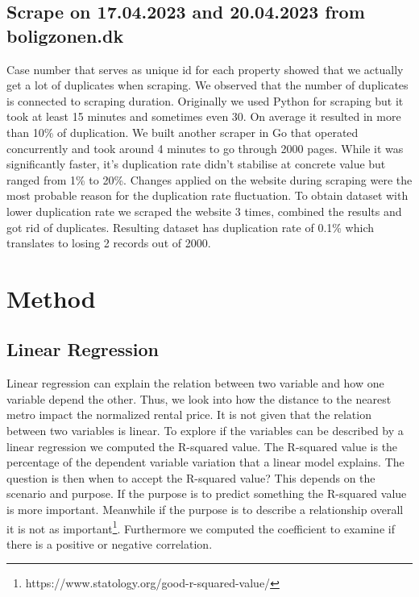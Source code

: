 \documentclass{article}
\begin{document}
\subsection{Scrape on 17.04.2023 and 20.04.2023 from boligzonen.dk}
Case number that serves as unique id for each property showed that we actually get a lot of duplicates when scraping. We observed that the number of duplicates is connected to scraping duration. Originally we used Python for scraping but it took at least 15 minutes and sometimes even 30. On average it resulted in more than 10\% of duplication. We built another scraper in Go that operated concurrently and took around 4 minutes to go through 2000 pages. While it was significantly faster, it's duplication rate didn't stabilise at concrete value but ranged from 1\% to 20\%. Changes applied on the website during scraping were the most probable reason for the duplication rate fluctuation. To obtain dataset with lower duplication rate we scraped the website 3 times, combined the results and got rid of duplicates. Resulting dataset has duplication rate of 0.1\% which translates to losing 2 records out of 2000.

\section{Method}

\subsection{Linear Regression} \label{Linear Regression Method}
Linear regression can explain the relation between two variable and how one variable depend the other. Thus, we look into how the distance to the nearest metro impact the normalized rental price. It is not given that the relation between two variables is linear. To explore if the variables can be described by a linear regression we computed the R-squared value. The R-squared value is the percentage of the dependent variable variation that a linear model explains. The question is then when to accept the R-squared value? This depends on the scenario and purpose. If the purpose is to predict something the R-squared value is more important. Meanwhile if the purpose is to describe a relationship overall it is not as important\footnote{https://www.statology.org/good-r-squared-value/}. Furthermore we computed the coefficient to examine if there is a positive or negative correlation. 

\end{document}
